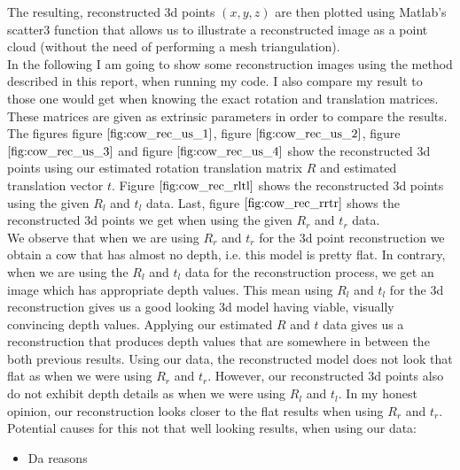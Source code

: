 \documentclass{paper}
\begin{document}
The resulting, reconstructed 3d points $(x,y,z)$ are then plotted using Matlab's scatter3 function that allows us to illustrate a reconstructed image as a point cloud (without the need of performing a mesh triangulation). \\

In the following I am going to show some reconstruction images using the method described in this report, when running my code. I also compare my result to those one would get when knowing the exact rotation and translation matrices. These matrices are given as extrinsic parameters in order to compare the results. \\

The figures figure $\ref{fig:cow_rec_us_1}$, figure $\ref{fig:cow_rec_us_2}$, figure $\ref{fig:cow_rec_us_3}$ and figure $\ref{fig:cow_rec_us_4}$ show the reconstructed 3d points using our estimated rotation translation matrix $R$ and estimated translation vector $t$. Figure $\ref{fig:cow_rec_rltl}$ shows the reconstructed 3d points using the given $R_l$ and $t_l$ data. Last, figure $\ref{fig:cow_rec_rrtr}$ shows the reconstructed 3d points we get when using the given $R_r$ and $t_r$ data. \\

We observe that when we are using $R_r$ and $t_r$ for the 3d point reconstruction we obtain a cow that has almost no depth, i.e. this model is pretty flat. In contrary, when we are using the $R_l$ and $t_l$ data for the reconstruction process, we get an image which has appropriate depth values. This mean using $R_l$ and $t_l$ for the 3d reconstruction gives us a good looking 3d model having viable, visually convincing depth values. Applying our estimated $R$ and $t$ data gives us a reconstruction that produces depth values that are somewhere in between the both previous results. Using our data, the reconstructed model does not look that flat as when we were using $R_r$ and $t_r$. However, our reconstructed 3d points also do not exhibit depth details as when we were using $R_l$ and $t_l$. In my honest opinion, our reconstruction looks closer to the flat results when using $R_r$ and $t_r$. \\

Potential causes for this not that well looking results, when using our data:
\begin{itemize}
    \item Da reasons
\end{itemize}
\end{document}
